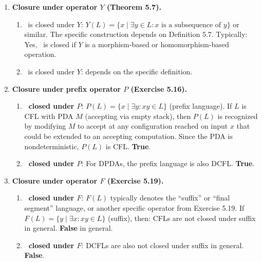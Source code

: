 \begin{enumerate}[{10.}1. ]
\begin{enumerate}
\item \ASIG\ is closed under $b$: similarly, using the DPDA construction.
\end{enumerate}

\item \textbf{Closure under operator $Y$ (Theorem 5.7).}

\begin{enumerate}
\item \PSIG\ is closed under $Y$: $Y(L) = \{x \mid \exists y\in L: x \text{ is a subsequence of } y\}$ or similar. The specific construction depends on Definition 5.7. Typically: Yes, \PSIG\ is closed if $Y$ is a morphism-based or homomorphism-based operation.

\item \ASIG\ is closed under $Y$: depends on the specific definition.
\end{enumerate}

\item \textbf{Closure under prefix operator $P$ (Exercise 5.16).}

\begin{enumerate}
\item \textbf{\PSIG\ closed under $P$}: $P(L) = \{x \mid \exists y: xy \in L\}$ (prefix language). If $L$ is CFL with PDA $M$ (accepting via empty stack), then $P(L)$ is recognized by modifying $M$ to accept at any configuration reached on input $x$ that could be extended to an accepting computation. Since the PDA is nondeterministic, $P(L)$ is CFL. \textbf{True}.

\item \textbf{\ASIG\ closed under $P$}: For DPDAs, the prefix language is also DCFL. \textbf{True}.
\end{enumerate}

\item \textbf{Closure under operator $F$ (Exercise 5.19).}

\begin{enumerate}
\item \textbf{\PSIG\ closed under $F$}: $F(L)$ typically denotes the ``suffix'' or ``final segment'' language, or another specific operator from Exercise 5.19. If $F(L) = \{y \mid \exists x: xy \in L\}$ (suffix), then: CFLs are not closed under suffix in general. \textbf{False} in general.

\item \textbf{\ASIG\ closed under $F$}: DCFLs are also not closed under suffix in general. \textbf{False}.
\end{enumerate}

\end{enumerate}
